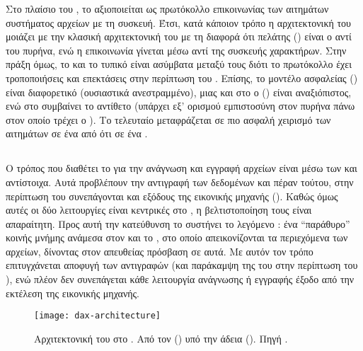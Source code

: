 Στο πλαίσιο του \viofs{}, το  αξιοποιείται ως πρωτόκολλο επικοινωνίας
των αιτημάτων συστήματος αρχείων με τη συσκευή. Έτσι, κατά κάποιον τρόπο η
αρχιτεκτονική του μοιάζει με την κλασική αρχιτεκτονική του  με τη
διαφορά ότι πελάτης () είναι ο  αντί του πυρήνα, ενώ η
επικοινωνία γίνεται μέσω  αντί της  συσκευής χαρακτήρων.
Στην πράξη όμως, το \viofs{} και το τυπικό  είναι ασύμβατα μεταξύ τους
διότι το πρωτόκολλο έχει τροποποιήσεις και επεκτάσεις στην περίπτωση του
\viofs{}. Επίσης, το μοντέλο ασφαλείας () είναι διαφορετικό
(ουσιαστικά ανεστραμμένο), μιας και στο \viofs{} ο  (\guest{}) είναι
αναξιόπιστος, ενώ στο  συμβαίνει το αντίθετο (υπάρχει εξ' ορισμού
εμπιστοσύνη στον πυρήνα πάνω στον οποίο τρέχει ο ). Το τελευταίο
μεταφράζεται σε πιο ασφαλή χειρισμό των αιτημάτων σε ένα \viofs{}  από ότι σε ένα .


\subsection{}
Ο τρόπος που διαθέτει το  για την ανάγνωση και εγγραφή αρχείων είναι
μέσω των  και  αντίστοιχα. Αυτά
προβλέπουν την αντιγραφή των δεδομένων και πέραν τούτου, στην περίπτωση του
\viofs{} συνεπάγονται και εξόδους της εικονικής μηχανής (). Καθώς
όμως αυτές οι δύο λειτουργίες είναι κεντρικές στο , η
βελτιστοποίηση τους είναι απαραίτητη. Προς αυτή την κατεύθυνση το \viofs{}
συστήνει το λεγόμενο : ένα ``παράθυρο'' κοινής μνήμης ανάμεσα
στον \host{} και το \guest{}, στο οποίο απεικονίζονται τα περιεχόμενα των
αρχείων, δίνοντας στον \guest{} απευθείας πρόσβαση σε αυτά. Με αυτόν τον τρόπο
επιτυγχάνεται αποφυγή των αντιγραφών (και παράκαμψη της  του
 στην περίπτωση του \linux{}), ενώ πλέον δεν συνεπάγεται κάθε
λειτουργία ανάγνωσης ή εγγραφής έξοδο από την εκτέλεση της εικονικής μηχανής.

\begin{figure}
    \centering
    \texttt{[image: dax-architecture]}
    \caption[Αρχιτεκτονική του  στο \viofs{}]{Αρχιτεκτονική του
         στο \viofs{}. Από τον 
        () υπό την άδεια 
        ().
        Πηγή
        .}
    \label{fig:dax-architecture}
\end{figure}

